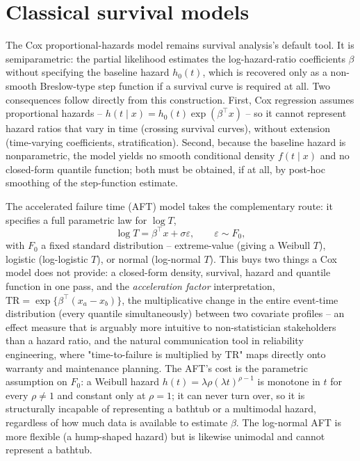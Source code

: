 \documentclass[11pt]{article}
\newcommand{\eps}{\varepsilon}
\begin{document}
\section{Classical survival models}
\label{sec:classical}

The Cox proportional-hazards model \citep{cox1972} remains survival
analysis's default tool. It is semiparametric: the partial likelihood
estimates the log-hazard-ratio coefficients $\beta$ without specifying the
baseline hazard $h_0(t)$, which is recovered only as a non-smooth
Breslow-type step function if a survival curve is required at all. Two
consequences follow directly from this construction. First, Cox regression
assumes proportional hazards -- $h(t\mid x) = h_0(t)\exp(\beta^\top x)$ --
so it cannot represent hazard ratios that vary in time (crossing survival
curves), without extension (time-varying coefficients, stratification).
Second, because the baseline hazard is nonparametric, the model yields no
smooth conditional density $f(t\mid x)$ and no closed-form quantile
function; both must be obtained, if at all, by post-hoc smoothing of the
step-function estimate.

The accelerated failure time (AFT) model \citep{wei1992aft} takes the
complementary route: it specifies a full parametric law for $\log T$,
\begin{equation}
  \log T = \beta^\top x + \sigma \eps, \qquad \eps \sim F_0,
  \label{eq:aft}
\end{equation}
with $F_0$ a fixed standard distribution -- extreme-value (giving a Weibull
$T$), logistic (log-logistic $T$), or normal (log-normal $T$). This
buys two things a Cox model does not provide: a closed-form density,
survival, hazard and quantile function in one pass, and the
\emph{acceleration factor} interpretation, $\mathrm{TR} =
\exp\{\beta^\top(x_a - x_b)\}$, the multiplicative change in the entire
event-time distribution (every quantile simultaneously) between two
covariate profiles -- an effect measure that is arguably more intuitive to
non-statistician stakeholders than a hazard ratio, and the natural
communication tool in reliability engineering, where "time-to-failure is
multiplied by $\mathrm{TR}$" maps directly onto warranty and maintenance
planning. The AFT's cost is the parametric assumption on $F_0$: a
Weibull hazard $h(t) = \lambda\rho(\lambda t)^{\rho-1}$ is monotone in $t$
for every $\rho \ne 1$ and constant only at $\rho=1$; it can never turn
over, so it is structurally incapable of representing a bathtub or a
multimodal hazard, regardless of how much data is available to estimate
$\beta$. The log-normal AFT is more flexible (a hump-shaped hazard) but
is likewise unimodal and cannot represent a bathtub.
\end{document}
